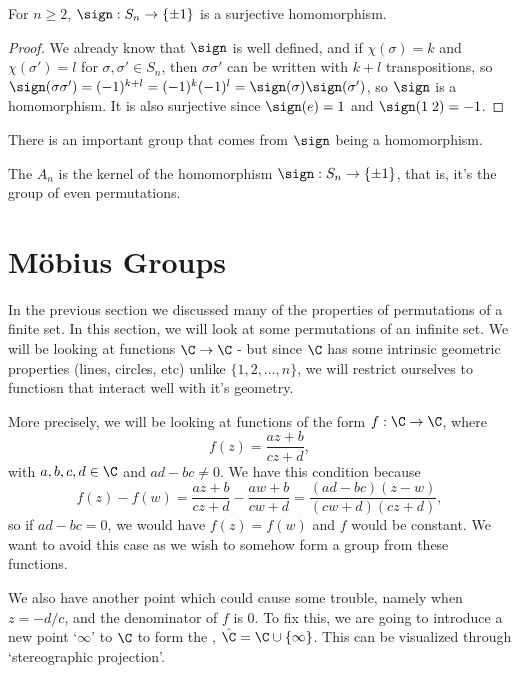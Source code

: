 \documentclass[a4]{scrreprt}
\begin{document}
\begin{proposition}
	For $n \geq 2$, $\sign : S_n \rightarrow \{\pm 1\}$ is a surjective homomorphism.
\end{proposition}
\begin{proof}
	We already know that $\sign$ is well defined, and if $\chi(\sigma) = k$ and $\chi(\sigma') = l$ for $\sigma, \sigma' \in S_n$, then $\sigma \sigma'$ can be written with $k + l$ transpositions, so $\sign(\sigma \sigma') = (-1)^{k + l} = (-1)^k (-1)^l = \sign(\sigma) \sign(\sigma')$, so $\sign$ is a homomorphism. It is also surjective since $\sign(e) = 1$ and $\sign(1\; 2) = -1$.
\end{proof}

There is an important group that comes from $\sign$ being a homomorphism.

\begin{definition}
	The  $A_n$ is the kernel of the homomorphism $\sign : S_n \rightarrow \{ \pm 1\}$, that is, it's the group of even permutations.
\end{definition}


\section{Möbius Groups}

In the previous section we discussed many of the properties of permutations of a finite set. In this section, we will look at some permutations of an infinite set. We will be looking at functions $\C \rightarrow \C$ - but since $\C$ has some intrinsic geometric properties (lines, circles, etc) unlike $\{1, 2, \dots, n\}$, we will restrict ourselves to functiosn that interact well with it's geometry.

More precisely, we will be looking at functions of the form $f: \C \rightarrow \C$, where
$$
f(z) = \frac{az + b}{cz + d},
$$
with $a, b, c, d \in \C$ and $ad - bc \neq 0$. We have this condition because 
$$
f(z) - f(w) = \frac{az + b}{cz + d} - \frac{aw + b}{cw + d} = \frac{(ad - bc)(z - w)}{(cw + d)(cz + d)},
$$
so if $ad - bc = 0$, we would have $f(z) = f(w)$ and $f$ would be constant. We want to avoid this case as we wish to somehow form a group from these functions. 

We also have another point which could cause some trouble, namely when $z = -d/c$, and the denominator of $f$ is 0. To fix this, we are going to introduce a new point `$\infty$' to $\C$ to form the , $\hat{\C} = \C \cup \{ \infty \}$.  This can be visualized through `stereographic projection'.
\end{document}
